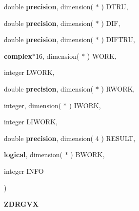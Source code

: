 {\begin{DoxyParamCaption}
\item[{double {\bf precision}, dimension( $\ast$ )}]{D\+T\+R\+U, }
\item[{double {\bf precision}, dimension( $\ast$ )}]{D\+I\+F, }
\item[{double {\bf precision}, dimension( $\ast$ )}]{D\+I\+F\+T\+R\+U, }
\item[{{\bf complex}$\ast$16, dimension( $\ast$ )}]{W\+O\+R\+K, }
\item[{integer}]{L\+W\+O\+R\+K, }
\item[{double {\bf precision}, dimension( $\ast$ )}]{R\+W\+O\+R\+K, }
\item[{integer, dimension( $\ast$ )}]{I\+W\+O\+R\+K, }
\item[{integer}]{L\+I\+W\+O\+R\+K, }
\item[{double {\bf precision}, dimension( 4 )}]{R\+E\+S\+U\+L\+T, }
\item[{{\bf logical}, dimension( $\ast$ )}]{B\+W\+O\+R\+K, }
\item[{integer}]{I\+N\+F\+O}
\end{DoxyParamCaption}
)}\label{group__complex16__eig_ga15555ac728d52bb12042d5b57152ecff}


{\bfseries Z\+D\+R\+G\+V\+X} 

